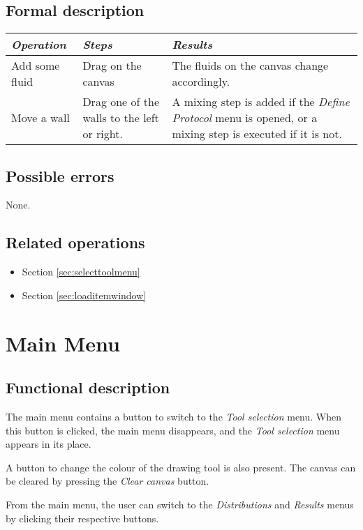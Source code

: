   \subsection*{Formal description}
  \begin{tabularx}{\textwidth}{XXX}
    \toprule
    \emph{Operation} & \emph{Steps} & \emph{Results} \\
    \midrule
    Add some fluid & Drag on the canvas & The fluids on the canvas change accordingly. \\
    \midrule
    Move a wall & Drag one of the walls to the left or right. & A mixing step is added if the \emph{Define Protocol} menu is opened, or a mixing step is executed if it is not. \\
    \bottomrule
  \end{tabularx}

  \subsection*{Possible errors}
  None.

  \subsection*{Related operations}
  \begin{itemize}
    \item Section \ref{sec:selecttoolmenu}
    \item Section \ref{sec:loaditemwindow}
  \end{itemize}  

\section{Main Menu}\label{sec:mainmenu}
  \subsection*{Functional description}
  The main menu contains a button to switch to the \emph{Tool selection} menu. When this button is clicked, the main menu disappears, and the \emph{Tool selection} menu appears in its place.
  
  A button to change the colour of the drawing tool is also present. The canvas can be cleared by pressing the \emph{Clear canvas} button.
  
  From the main menu, the user can switch to the \emph{Distributions} and \emph{Results} menus by clicking their respective buttons.
  
